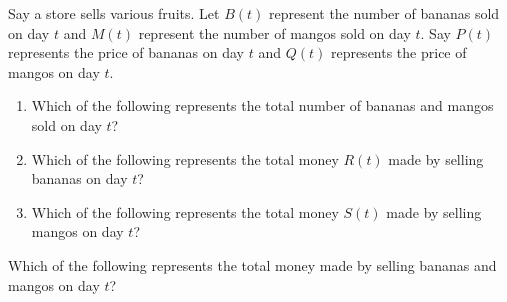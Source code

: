 \documentclass{ximera}
\author{Kenneth Berglund}
\begin{document}
\begin{exercise}
Say a store sells various fruits. Let $B(t)$ represent the number of bananas sold on day $t$ and $M(t)$ represent the number of mangos sold on day $t$. Say $P(t)$ represents the price of bananas on day $t$ and $Q(t)$ represents the price of mangos on day $t$.
\begin{enumerate}
\item Which of the following represents the total number of bananas and mangos sold on day $t$?
\begin{multipleChoice}
\end{multipleChoice}

\item Which of the following represents the total money $R(t)$ made by selling bananas on day $t$?
\begin{multipleChoice}
\end{multipleChoice}

\item Which of the following represents the total money $S(t)$ made by selling mangos on day $t$?
\begin{multipleChoice}
\end{multipleChoice}
\end{enumerate}

Which of the following represents the total money made by selling bananas and mangos on day $t$?
\begin{multipleChoice}
\end{multipleChoice}

\end{exercise}
\end{document}
